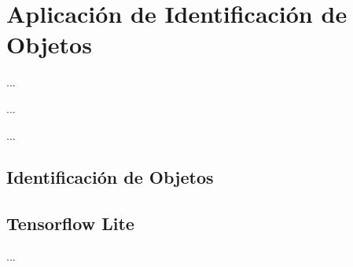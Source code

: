%
%

\chapter{Aplicación de Identificación de Objetos}

\begin{FraseCelebre}
\begin{Frase}
...
\end{Frase}
\begin{Fuente}
...
\end{Fuente}
\end{FraseCelebre}

\begin{resumen}
...
\end{resumen}




\section{Identificación de Objetos}
\label{cap5:sec:identificacion-objetos}


\section{Tensorflow Lite}
\label{cap5:sec:tensorflow-lite}


...

\section*{\NotasBibliograficas}
\TocNotasBibliograficas


